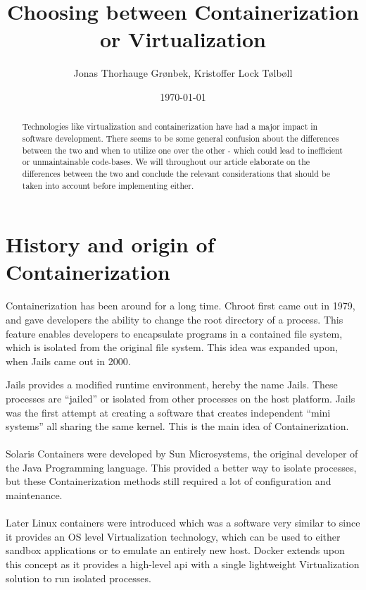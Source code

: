 \documentclass[a4paper,10pt]{article}
\title{Choosing between Containerization or Virtualization}
\author{Jonas Thorhauge Grønbek, Kristoffer Lock Tølbøll}
\date{\today}
\begin{document}
			
	\maketitle
	\thispagestyle{empty}
	
	\begin{abstract}
	Technologies like virtualization and containerization have had a major impact in software development. There seems to be some general confusion about the differences between the two and when to utilize one over the other - which could lead to inefficient or unmaintainable code-bases. We will throughout our article elaborate on the differences between the two and conclude the relevant considerations that should be taken into account before implementing either.
	\end{abstract}
	
	\section{History and origin of Containerization}
	Containerization has been around for a long time. Chroot first came out in 1979, and gave developers the ability to change the root directory of a process. This feature enables developers to encapsulate programs in a contained file system, which is isolated from the original file system. This idea was expanded upon, when Jails came out in 2000.

	Jails provides a modified runtime environment, hereby the name Jails. \cite{pii:2014}These processes are “jailed” or isolated from other processes on the host platform. Jails was the first attempt at creating a software that creates independent “mini systems” all sharing the same kernel. This is the main idea of Containerization. \\\\
	Solaris Containers were developed by Sun Microsystems, the original developer of the Java Programming language. This provided a better way to isolate processes, but these Containerization methods still required a lot of configuration and maintenance.\\\\
	Later Linux containers were introduced which was a software very similar to since it provides an OS level Virtualization technology, which can be used to either sandbox applications or to emulate an entirely new host. Docker extends upon this concept as it provides a high-level api with a single lightweight Virtualization solution to run isolated processes. 
	
\end{document}
